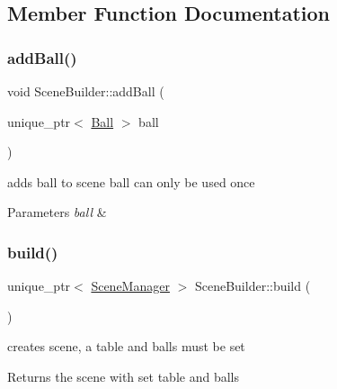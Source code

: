 \subsection{Member Function Documentation}
\mbox{\label{class_scene_builder_acd9bf7b1987bf61c8e6ef0a6f13061ee}} 
\subsubsection{\texorpdfstring{add\+Ball()}{addBall()}}
{\footnotesize\ttfamily void Scene\+Builder\+::add\+Ball (\begin{DoxyParamCaption}\item[{unique\+\_\+ptr$<$ \mbox{\hyperlink{class_ball}{Ball}} $>$}]{ball }\end{DoxyParamCaption})}



adds ball to scene ball can only be used once 


\begin{DoxyParams}{Parameters}
{\em ball} & \\
\hline
\end{DoxyParams}
\mbox{\label{class_scene_builder_afb796818b78d4a51c256216791cf7fe1}} 
\subsubsection{\texorpdfstring{build()}{build()}}
{\footnotesize\ttfamily unique\+\_\+ptr$<$ \mbox{\hyperlink{class_scene_manager}{Scene\+Manager}} $>$ Scene\+Builder\+::build (\begin{DoxyParamCaption}{ }\end{DoxyParamCaption})}



creates scene, a table and balls must be set 

\begin{DoxyReturn}{Returns}
the scene with set table and balls 
\end{DoxyReturn}
\mbox{\label{class_scene_builder_a62dd1cf314cf0b04cec2435a3c77c281}} 
